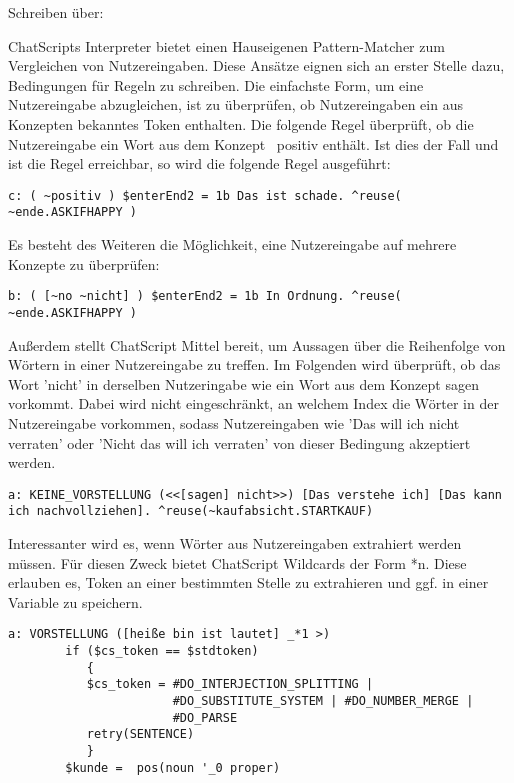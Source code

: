 Schreiben über:

ChatScripts Interpreter bietet einen Hauseigenen Pattern-Matcher zum Vergleichen von Nutzereingaben. Diese Ansätze eignen sich an erster Stelle dazu, Bedingungen für Regeln zu schreiben. Die einfachste Form, um eine Nutzereingabe abzugleichen, ist zu überprüfen, ob Nutzereingaben ein aus Konzepten bekanntes Token enthalten. Die folgende Regel überprüft, ob die Nutzereingabe ein Wort aus dem Konzept ~positiv enthält. Ist dies der Fall und ist die Regel erreichbar, so wird die folgende Regel ausgeführt:

\begin{lstlisting}[caption={Regel in kaufabsicht.top}]
c: ( ~positiv ) $enterEnd2 = 1b Das ist schade. ^reuse( ~ende.ASKIFHAPPY )
\end{lstlisting}

Es besteht des Weiteren die Möglichkeit, eine Nutzereingabe auf mehrere Konzepte zu überprüfen: 

\begin{lstlisting}[caption={Regel in kaufabsicht.top}]
b: ( [~no ~nicht] ) $enterEnd2 = 1b In Ordnung. ^reuse( ~ende.ASKIFHAPPY )
\end{lstlisting}

Außerdem stellt ChatScript Mittel bereit, um Aussagen über die Reihenfolge von Wörtern in einer Nutzereingabe zu treffen. Im Folgenden wird überprüft, ob das Wort 'nicht' in derselben Nutzeringabe wie ein Wort aus dem Konzept sagen vorkommt. Dabei wird nicht eingeschränkt, an welchem Index die Wörter in der Nutzereingabe vorkommen, sodass Nutzereingaben wie 'Das will ich nicht verraten' oder 'Nicht das will ich verraten' von dieser Bedingung akzeptiert werden. 

\begin{lstlisting}[caption={Regel KEINE_VORSTELLUNG in introductions.top}]
a: KEINE_VORSTELLUNG (<<[sagen] nicht>>) [Das verstehe ich] [Das kann ich nachvollziehen]. ^reuse(~kaufabsicht.STARTKAUF)
\end{lstlisting}

Interessanter wird es, wenn Wörter aus Nutzereingaben extrahiert werden müssen. Für diesen Zweck bietet ChatScript Wildcards der Form *n. Diese erlauben es, Token an einer bestimmten Stelle zu extrahieren und ggf. in einer Variable zu speichern. 

\begin{lstlisting}[caption={Regel in introductions.top}]
a: VORSTELLUNG ([heiße bin ist lautet] _*1 >)
	    if ($cs_token == $stdtoken)
           {
           $cs_token = #DO_INTERJECTION_SPLITTING |
                       #DO_SUBSTITUTE_SYSTEM | #DO_NUMBER_MERGE |
                       #DO_PARSE
           retry(SENTENCE)
           }
        $kunde =  pos(noun '_0 proper)
\end{lstlisting}

